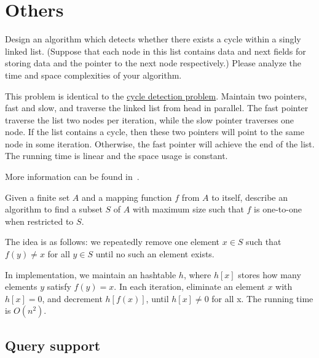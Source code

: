 \section{Others}
\begin{Exercise}[title={Cycle detection problem},origin={MCU CSIE 95}]
Design an algorithm which detects whether there exists a cycle within a singly linked list. (Suppose that each node in this list contains data and next fields for storing data and the pointer to the next node respectively.) Please analyze the time and space complexities of your algorithm.
\end{Exercise}
\begin{Answer}
This problem is identical to the \href{https://en.wikipedia.org/wiki/Cycle_detection}{cycle detection problem}. Maintain two pointers, fast and slow, and traverse the linked list from head in parallel. The fast pointer traverse the list two nodes per iteration, while the slow pointer traverses one node. If the list contains a cycle, then these two pointers will point to the same node in some iteration. Otherwise, the fast pointer will achieve the end of the list. The running time is linear and the space usage is constant.

\begin{remark}
More information can be found in~\cite{Nesterenko2012}.
\end{remark}
\end{Answer}

\begin{Exercise}[origin={NCTU CSIE 91}]
Given a finite set $A$ and a mapping function $f$ from $A$ to itself, describe an algorithm to find a subset $S$ of $A$ with maximum size such that $f$ is one-to-one when restricted to $S$.
\end{Exercise}
\begin{Answer}
The idea is as follows: we repeatedly remove one element $x \in S$ such that $f(y) \neq x$ for all $y \in S$ until no such an element exists.

In implementation, we maintain an hashtable $h$, where $h[x]$ stores how many elements $y$ satisfy $f(y) = x$. In each iteration, eliminate an element $x$ with $h[x] = 0$, and decrement $h[f(x)]$, until $h[x] \neq 0$ for all x. The running time is $O(n^2)$.
\end{Answer}

\subsection{Query support}

